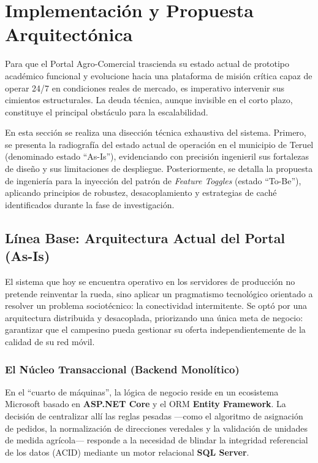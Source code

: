 \section{Implementación y Propuesta Arquitectónica}

Para que el Portal Agro-Comercial trascienda su estado actual de prototipo académico funcional y evolucione hacia una plataforma de misión crítica capaz de operar 24/7 en condiciones reales de mercado, es imperativo intervenir sus cimientos estructurales. La deuda técnica, aunque invisible en el corto plazo, constituye el principal obstáculo para la escalabilidad.

En esta sección se realiza una disección técnica exhaustiva del sistema. Primero, se presenta la radiografía del estado actual de operación en el municipio de Teruel (denominado estado ``As-Is''), evidenciando con precisión ingenieril sus fortalezas de diseño y sus limitaciones de despliegue. Posteriormente, se detalla la propuesta de ingeniería para la inyección del patrón de \textit{Feature Toggles} (estado ``To-Be''), aplicando principios de robustez, desacoplamiento y estrategias de caché identificados durante la fase de investigación.

\subsection{Línea Base: Arquitectura Actual del Portal (As-Is)}

El sistema que hoy se encuentra operativo en los servidores de producción no pretende reinventar la rueda, sino aplicar un pragmatismo tecnológico orientado a resolver un problema sociotécnico: la conectividad intermitente. Se optó por una arquitectura distribuida y desacoplada, priorizando una única meta de negocio: garantizar que el campesino pueda gestionar su oferta independientemente de la calidad de su red móvil.

\subsubsection{El Núcleo Transaccional (Backend Monolítico)}

En el ``cuarto de máquinas'', la lógica de negocio reside en un ecosistema Microsoft basado en \textbf{ASP.NET Core} y el ORM \textbf{Entity Framework}. La decisión de centralizar allí las reglas pesadas —como el algoritmo de asignación de pedidos, la normalización de direcciones veredales y la validación de unidades de medida agrícola— responde a la necesidad de blindar la integridad referencial de los datos (ACID) mediante un motor relacional \textbf{SQL Server}.


